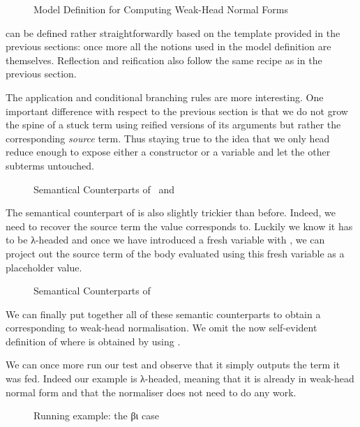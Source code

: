 \begin{figure}[h]
\caption{Model Definition for Computing Weak-Head Normal Forms\label{fig:betaiotamodel}}
\end{figure}

 can be defined rather straightforwardly based on the template
provided in the previous sections: once more all the notions used in the model
definition are  themselves. Reflection and reification also
follow the same recipe as in the previous section.

The application and conditional branching rules are more
interesting. One important difference with respect to the previous
section is that we do not grow the spine of a stuck term using
reified versions of its arguments but rather the corresponding
\emph{source} term. Thus staying true to the idea that we only head
reduce enough to expose either a constructor or a variable and let
the other subterms untouched.

\begin{figure}[h]
\caption{Semantical Counterparts of ~and \label{fig:betaiotaappifte}}
\end{figure}

The semantical counterpart of  is also slightly trickier than
before. Indeed, we need to recover the source term the value corresponds
to. Luckily we know it has to be λ-headed and once we have introduced a
fresh variable with , we can project out the source term of
the body evaluated using this fresh variable as a placeholder value.

\begin{figure}[h]
\caption{Semantical Counterparts of \label{fig:betaiotalam}}
\end{figure}

We can finally put together all of these semantic counterparts to
obtain a  corresponding to weak-head normalisation.
We omit the now self-evident definition of  where 
is obtained by using .

We can once more run our test and observe that it simply outputs the
term it was fed. Indeed our example is λ-headed, meaning that it is
already in weak-head normal form and that the normaliser does not need
to do any work.

\begin{figure}[h]
\caption{Running example: the βι case}\label{fig:betaiotaxitest}
\end{figure}
